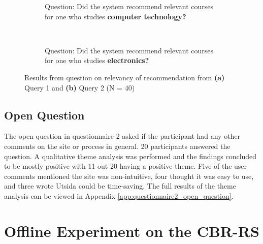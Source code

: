 \begin{figure}[h]
    \centering
    \begin{subfigure}[b]{0.4\textwidth}
        
        \caption{Question: Did the system recommend relevant courses for one who studies \textbf{computer technology?}}
        \label{fig:predesigned_2_p1}
    \end{subfigure}
    ~ \qquad %
    \begin{subfigure}[b]{0.4\textwidth}
       
        \caption{Question: Did the system recommend relevant courses for one who studies \textbf{electronics?}}
        \label{fig:predesigned_2_p2}
    \end{subfigure}
    \caption[Result for relevancy of pre-defined recommendation]{Results from question on relevancy of recommendation from \textbf{(a)} Query 1 and \textbf{(b)} Query 2 (N = 40)}
    \label{fig:predesigned_2}
\end{figure}


\FloatBarrier

\subsection{Open Question}

The open question in questionnaire 2 asked if the participant had any other comments on the site or process in general. 20 participants answered the question. A qualitative theme analysis \cite{oates2005researching} was performed and the findings concluded to be mostly positive with 11 out 20 having a positive theme. Five of the user comments mentioned the site was non-intuitive, four thought it was easy to use, and three wrote Utsida could be time-saving. The full results of the theme analysis can be viewed in Appendix \ref{app:questionnaire2_open_question}.

\FloatBarrier
\section{Offline Experiment on the CBR-RS}

